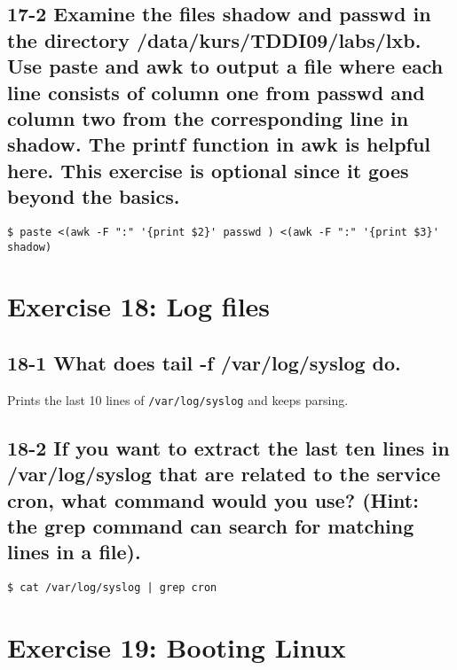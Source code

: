 \subsection{17-2 Examine the files shadow and passwd in the directory /data/kurs/TDDI09/labs/lxb. Use paste and awk to output a file where each line consists of column one from passwd and column two from the corresponding line in shadow. The printf function in awk is helpful here. This exercise is optional since it goes beyond the basics.}
\begin{verbatim}$ paste <(awk -F ":" '{print $2}' passwd ) <(awk -F ":" '{print $3}' shadow)\end{verbatim}

\section{Exercise 18: Log files}
\subsection{18-1 What does tail -f /var/log/syslog do.}
Prints the last 10 lines of \verb=/var/log/syslog= and keeps parsing.

\subsection{18-2 If you want to extract the last ten lines in /var/log/syslog that are related to the service cron, what command would you use? (Hint: the grep command can search for matching lines in a file).}
\verb=$ cat /var/log/syslog | grep cron=


\section{Exercise 19: Booting Linux}
